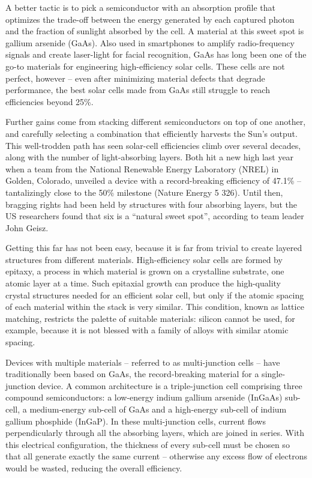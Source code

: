 \documentclass[
]{book}
\begin{document}
A better tactic is to pick a semiconductor with an absorption profile that optimizes the trade-off between the energy generated by each captured photon and the fraction of sunlight absorbed by the cell. A material at this sweet spot is gallium arsenide (GaAs). Also used in smartphones to amplify radio-frequency signals and create laser-light for facial recognition, GaAs has long been one of the go-to materials for engineering high-efficiency solar cells. These cells are not perfect, however -- even after minimizing material defects that degrade performance, the best solar cells made from GaAs still struggle to reach efficiencies beyond 25\%.

Further gains come from stacking different semiconductors on top of one another, and carefully selecting a combination that efficiently harvests the Sun's output. This well-trodden path has seen solar-cell efficiencies climb over several decades, along with the number of light-absorbing layers. Both hit a new high last year when a team from the National Renewable Energy Laboratory (NREL) in Golden, Colorado, unveiled a device with a record-breaking efficiency of 47.1\% -- tantalizingly close to the 50\% milestone (Nature Energy 5 326). Until then, bragging rights had been held by structures with four absorbing layers, but the US researchers found that six is a ``natural sweet spot'', according to team leader John Geisz.

Getting this far has not been easy, because it is far from trivial to create layered structures from different materials. High-efficiency solar cells are formed by epitaxy, a process in which material is grown on a crystalline substrate, one atomic layer at a time. Such epitaxial growth can produce the high-quality crystal structures needed for an efficient solar cell, but only if the atomic spacing of each material within the stack is very similar. This condition, known as lattice matching, restricts the palette of suitable materials: silicon cannot be used, for example, because it is not blessed with a family of alloys with similar atomic spacing.

Devices with multiple materials -- referred to as multi-junction cells -- have traditionally been based on GaAs, the record-breaking material for a single-junction device. A common architecture is a triple-junction cell comprising three compound semiconductors: a low-energy indium gallium arsen­ide (InGaAs) sub-cell, a medium-energy sub-cell of GaAs and a high-energy sub-cell of indium gallium phosphide (InGaP). In these multi-junction cells, current flows perpendicularly through all the absorbing layers, which are joined in series. With this electrical configuration, the thickness of every sub-cell must be chosen so that all generate exactly the same current -- otherwise any excess flow of electrons would be wasted, reducing the overall efficiency.
\end{document}
